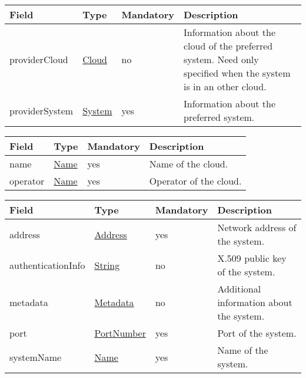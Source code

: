 \documentclass[a4paper]{arrowhead}
\newcommand{\pref}[1]{{\textcolor{ArrowheadGrey}{\hyperref[sec:model:primitives:#1]{#1}}}}
\begin{document}
\begin{table}[ht!]
\begin{tabularx}{\textwidth}{| p{4cm} | p{4cm} | p{2cm} | X |} \hline
\rowcolor{gray!33} Field & Type & Mandatory & Description \\ \hline

providerCloud &\hyperref[sec:model:Cloud]{Cloud} & no & Information about the cloud of the preferred system. Need only specified when the system is in an other cloud. \\ \hline
providerSystem &\hyperref[sec:model:System]{System} & yes & Information about the preferred system.  \\ \hline
\end{tabularx}
\end{table}

\label{sec:model:Cloud}

\begin{table}[ht!]
\begin{tabularx}{\textwidth}{| p{4cm} | p{4cm} | p{2cm} | X |} \hline
\rowcolor{gray!33} Field & Type & Mandatory & Description \\ \hline

name &\pref{Name} & yes & Name of the cloud. \\ \hline
operator &\pref{Name} & yes & Operator of the cloud. \\ \hline
\end{tabularx}
\end{table}

\label{sec:model:System}

\begin{table}[ht!]
\begin{tabularx}{\textwidth}{| p{4cm} | p{4cm} | p{2cm} | X |} \hline
\rowcolor{gray!33} Field & Type & Mandatory & Description \\ \hline

address &\pref{Address} & yes & Network address of the system. \\ \hline
authenticationInfo &\pref{String} & no & X.509 public key of the system. \\ \hline
metadata &\hyperref[sec:model:Metadata]{Metadata} & no & Additional information about the system. \\ \hline
port &\pref{PortNumber} & yes & Port of the system. \\ \hline
systemName &\pref{Name} & yes & Name of the system. \\ \hline
\end{tabularx}
\end{table}
\end{document}
